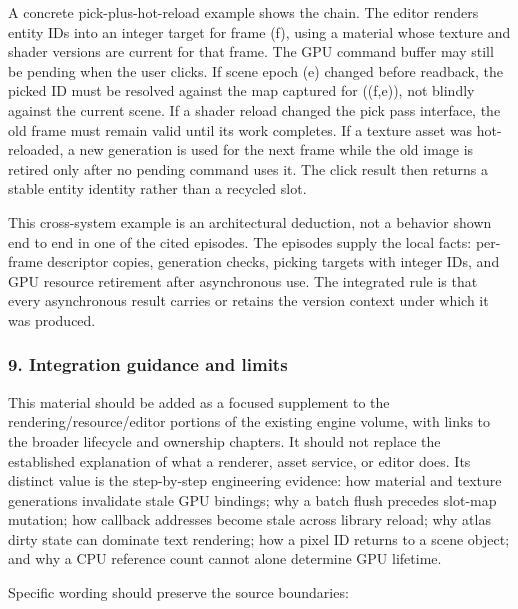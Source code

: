 A concrete pick-plus-hot-reload example shows the chain. The editor renders entity IDs into an integer target for frame (f), using a material whose texture and shader versions are current for that frame. The GPU command buffer may still be pending when the user clicks. If scene epoch (e) changed before readback, the picked ID must be resolved against the map captured for ((f,e)), not blindly against the current scene. If a shader reload changed the pick pass interface, the old frame must remain valid until its work completes. If a texture asset was hot-reloaded, a new generation is used for the next frame while the old image is retired only after no pending command uses it. The click result then returns a stable entity identity rather than a recycled slot.

This cross-system example is an architectural deduction, not a behavior shown end to end in one of the cited episodes. The episodes supply the local facts: per-frame descriptor copies, generation checks, picking targets with integer IDs, and GPU resource retirement after asynchronous use. The integrated rule is that every asynchronous result carries or retains the version context under which it was produced.

\subsubsection{9. Integration guidance and limits}\label{integration-guidance-and-limits}

This material should be added as a focused supplement to the rendering/resource/editor portions of the existing engine volume, with links to the broader lifecycle and ownership chapters. It should not replace the established explanation of what a renderer, asset service, or editor does. Its distinct value is the step-by-step engineering evidence: how material and texture generations invalidate stale GPU bindings; why a batch flush precedes slot-map mutation; how callback addresses become stale across library reload; why atlas dirty state can dominate text rendering; how a pixel ID returns to a scene object; and why a CPU reference count cannot alone determine GPU lifetime.

Specific wording should preserve the source boundaries:

